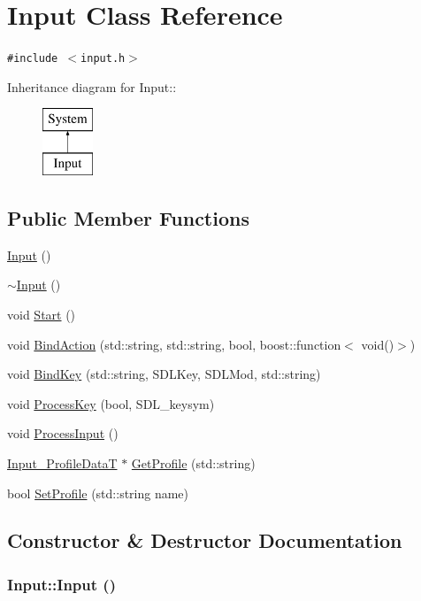 \hypertarget{class_input}{
\section{Input Class Reference}
\label{class_input}
}
{\tt \#include $<$input.h$>$}

Inheritance diagram for Input::\begin{figure}[H]
\begin{center}
\leavevmode
\includegraphics[height=2cm]{class_input}
\end{center}
\end{figure}
\subsection*{Public Member Functions}
\begin{CompactItemize}
\item 
\hyperlink{class_input_bae3f379d3f157cf42dc857309832dba}{Input} ()
\item 
\hyperlink{class_input_f2db35ba67c8a8ccd23bef6a482fc291}{$\sim$Input} ()
\item 
void \hyperlink{class_input_1808108d296e25985cfd442d8a2c9d12}{Start} ()
\item 
void \hyperlink{class_input_9f5f01802b1de327b4dd03cadfad7651}{BindAction} (std::string, std::string, bool, boost::function$<$ void()$>$)
\item 
void \hyperlink{class_input_e0e1471412ec5a992a0e258d5486aeab}{BindKey} (std::string, SDLKey, SDLMod, std::string)
\item 
void \hyperlink{class_input_d975a574f8ecb71a429d9cbeeecd12fd}{ProcessKey} (bool, SDL\_\-keysym)
\item 
void \hyperlink{class_input_79b770f9707946fd6ad48668a4ad13cc}{ProcessInput} ()
\item 
\hyperlink{struct_input___profile_data_t}{Input\_\-ProfileDataT} $\ast$ \hyperlink{class_input_db61ed1151c5ba9df5c53951c56efd0a}{GetProfile} (std::string)
\item 
bool \hyperlink{class_input_f1470cec71424b0e82d2ebd01efb9528}{SetProfile} (std::string name)
\end{CompactItemize}


\subsection{Constructor \& Destructor Documentation}
\hypertarget{class_input_bae3f379d3f157cf42dc857309832dba}{
\subsubsection[{Input}]{\setlength{\rightskip}{0pt plus 5cm}Input::Input ()}}
\label{class_input_bae3f379d3f157cf42dc857309832dba}


